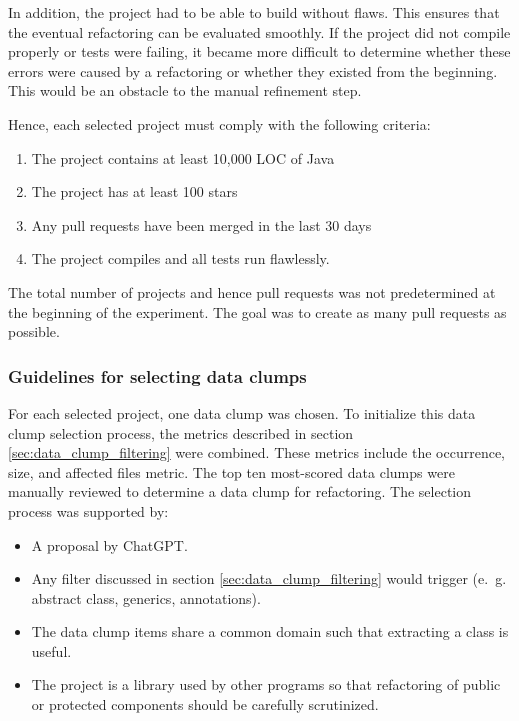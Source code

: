 In addition, the project had to be able to build without flaws. This ensures that the eventual refactoring can be evaluated smoothly. If the project did not compile properly or tests were failing, it became more difficult to determine whether these errors were caused by a refactoring or whether they existed from the beginning. This would be an obstacle to the manual refinement step.


Hence, each selected project must comply with the following criteria:
\begin{enumerate}
    \item The project contains at least  10,000 \ac{LOC} of Java
        \item The project  has at least 100 stars
\item Any pull requests have been merged in the last 30 days
\item The project compiles and all tests run flawlessly.
\end{enumerate}


The total number of projects and hence pull requests was not predetermined at the beginning of the experiment. The goal was to create as many pull requests as possible. 


\subsubsection{Guidelines for selecting data clumps}

For each selected project, one data clump was chosen. To initialize this data clump selection process, the metrics described in section \ref{sec:data_clump_filtering} were combined. These metrics include the occurrence, size, and affected files metric. The top ten most-scored data clumps were manually reviewed to determine a data clump for refactoring. The selection process was supported by:
\begin{itemize}
\item A proposal by ChatGPT. 
    \item Any filter discussed in section \ref{sec:data_clump_filtering} would trigger (e.~g. abstract class, generics, annotations).
    \item The data clump items share a common domain such that extracting a class is useful. 
    \item The project is a library used by other programs so that refactoring of public or protected components should be carefully scrutinized. 
\end{itemize}

